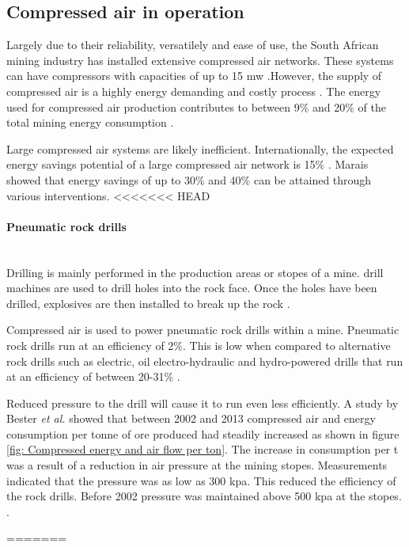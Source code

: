 \subsection{Compressed air in operation}
	Largely due to their reliability, versatilely and ease of use, the South African mining industry has installed extensive compressed air networks. These systems can have compressors with capacities of up to 15 \gls{mw} \cite{Marais2012PhD}.However, the supply of compressed air is a highly energy demanding and costly process \cite{padachi2009energy}.  The energy used for compressed air production contributes to between 9\% and 20\% of the total mining energy consumption	\cite{Eskom2010Energy,du2011development}. 
	\par
	Large compressed air systems are likely inefficient. Internationally, the expected energy savings potential of a large compressed air network is 15\% \cite{neale2009compressed}. Marais \cite{marais2013simplification} showed that energy savings of up to 30\% and 40\% can be attained through various interventions. 
<<<<<<< HEAD
	\paragraph{Pneumatic rock drills}\leavevmode\\
	 Drilling is mainly performed in the production areas or stopes of a mine. drill machines are used to drill holes into the rock face. Once the holes have been drilled, explosives are then installed to break up the rock \cite{van2008development}.
	 \par
	  Compressed air is used to power pneumatic rock drills within a mine. Pneumatic rock drills run at an efficiency of 2\%. This is low when compared to alternative rock drills such as electric, oil electro-hydraulic and hydro-powered drills that run at an efficiency of between 20-31\% \cite{fraser2008saving,vanTonder2010Masters}. 
	  \par
	  Reduced pressure to the drill will cause it to run even less efficiently. A study by  Bester \textit{et al.} showed that between 2002 and 2013 compressed air and energy consumption per tonne of ore produced had steadily increased as shown in figure \ref{fig: Compressed energy and air flow per ton}. The increase in consumption per \gls{t} was a result of a reduction in air pressure at the mining stopes. Measurements indicated that the pressure was as low as 300 \gls{kpa}. This reduced the efficiency of the rock drills. Before 2002 pressure was maintained above 500 \gls{kpa} at the stopes.  .\cite{bester2013effect} \par
=======
